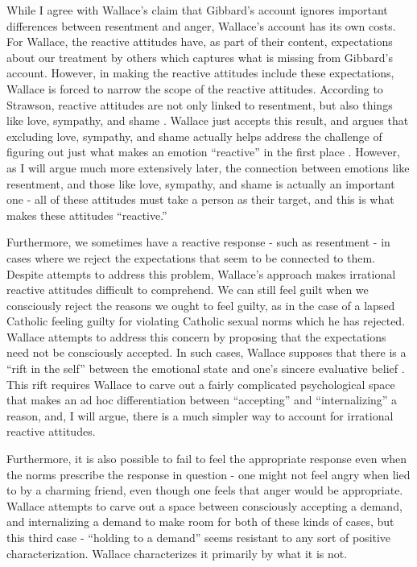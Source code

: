 \documentclass[phd,12pt,oneside,paper=letterpaper]{ubcthesis}
\begin{document}
While I agree with Wallace's claim that Gibbard's account ignores important differences between resentment and anger, Wallace's account has its own costs. For Wallace, the reactive attitudes have, as part of their content, expectations about our treatment by others which captures what is missing from Gibbard's account. However, in making the reactive attitudes include these expectations, Wallace is forced to narrow the scope of the reactive attitudes. According to Strawson, reactive attitudes are not only linked to resentment, but also things like love, sympathy, and shame \citep[p.9]{strawsonp1974}. Wallace just accepts this result, and argues that excluding love, sympathy, and shame actually helps address the challenge of figuring out just what makes an emotion ``reactive'' in the first place \citep[p.30]{wallace1994}. However, as I will argue much more extensively later, the connection between emotions like resentment, and those like love, sympathy, and shame is actually an important one - all of these attitudes must take a person as their target, and this is what makes these attitudes ``reactive.'' 

Furthermore, we sometimes have a reactive response - such as resentment - in cases where we reject the expectations that seem to be connected to them. Despite attempts to address this problem, Wallace's approach makes irrational reactive attitudes difficult to comprehend. We can still feel guilt when we consciously reject the reasons we ought to feel guilty, as in the case of a lapsed Catholic feeling guilty for violating Catholic sexual norms which he has rejected. Wallace attempts to address this concern by proposing that the expectations need not be consciously accepted. In such cases, Wallace supposes that there is a ``rift in the self'' between the emotional state and one's sincere evaluative belief \citep[p.46]{wallace1994}. This rift requires Wallace to carve out a fairly complicated psychological space that makes an ad hoc differentiation between ``accepting'' and ``internalizing'' a reason, and, I will argue, there is a much simpler way to account for irrational reactive attitudes. 

Furthermore, it is also possible to fail to feel the appropriate response even when the norms prescribe the response in question - one might not feel angry when lied to by a charming friend, even though one feels that anger would be appropriate. Wallace attempts to carve out a space between consciously accepting a demand, and internalizing a demand to make room for both of these kinds of cases, but this third case - ``holding to a demand'' seems resistant to any sort of positive characterization. Wallace characterizes it primarily by what it is not.
\end{document}
